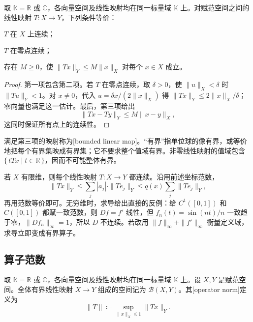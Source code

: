 \begin{proposition}\label{b1:prop:bounded-linear-equivalence}
取 \(\mathbb K=\mathbb R\) 或 \(\mathbb C\)，各向量空间及线性映射均在同一标量域 \(\mathbb K\) 上。对赋范空间之间的线性映射 \(T:X\rightarrow Y\)，下列条件等价：
\begin{equivalences}
\item\label{b1:item:linear-continuous} \(T\) 在 \(X\) 上连续；
\item\label{b1:item:linear-continuous-zero} \(T\) 在零点连续；
\item\label{b1:item:linear-bound} 存在 \(M\geq0\)，使 \(\|Tx\|_Y\leq M\|x\|_X\) 对每个 \(x\in X\) 成立。
\end{equivalences}
\end{proposition}
\begin{proof}
第一项包含第二项。若 \(T\) 在零点连续，取 \(\delta>0\)，使 \(\|u\|_X<\delta\) 时 \(\|Tu\|_Y<1\)。对 \(x\ne0\)，代入 \(u=\delta x/(2\|x\|_X)\) 得 \(\|Tx\|_Y\leq2\|x\|_X/\delta\)；零向量也满足这一估计。最后，第三项给出
\[
\|Tx-Ty\|_Y\leq M\|x-y\|_X,
\]
这同时保证所有点上的连续性。
\end{proof}

满足第三项的映射称为[bounded linear map]。“有界”指单位球的像有界，或等价地把每个有界集映成有界集；它不要求整个值域有界。非零线性映射的值域包含 \(\{\,tTx\mid t\in\mathbb R\,\}\)，因而不可能整体有界。

\ProseParagraphBreak

若 \(X\) 有限维，则每个线性映射 \(T:X\rightarrow Y\) 都连续。沿用前述坐标范数，
\[
\|Tx\|_Y\leq\sum_j|a_j|\cdot\|Te_j\|_Y
\leq q(x)\sum_j\|Te_j\|_Y,
\]
再用范数等价即可。无穷维时，求导给出直接的反例：给 \(C^1([0,1])\) 和 \(C([0,1])\) 都赋一致范数，则 \(Df=f'\) 线性，但 \(f_n(t)=\sin(nt)/n\) 一致趋于零，\(\|Df_n\|_\infty=1\)，所以 \(D\) 不连续。若改用 \(\|f\|_\infty+\|f'\|_\infty\) 衡量定义域，求导立即变成有界算子。

\subsection{算子范数}
\label{b1:subsec:080103}

\begin{definition}\label{b1:def:operator-norm}
取 \(\mathbb K=\mathbb R\) 或 \(\mathbb C\)，各向量空间及线性映射均在同一标量域 \(\mathbb K\) 上。设 \(X,Y\) 是赋范空间。全体有界线性映射 \(X\rightarrow Y\) 组成的空间记为 \(\mathcal B(X,Y)\)。其[operator norm]定义为
\[
\|T\|\coloneqq\sup_{\|x\|_X\leq1}\|Tx\|_Y.
\]
\end{definition}

